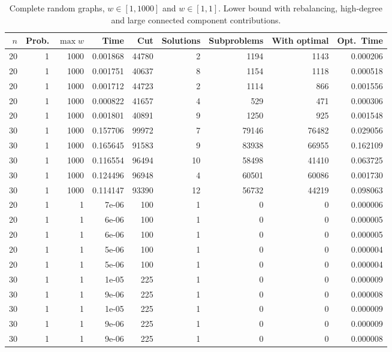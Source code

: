 \documentclass[a4paper,11pt]{article}
\begin{document}
\begin{table}
\begin{center}
\begin{tabular}{|rrr|r|r|rrr|r|}
\hline
$n$ & Prob. & $\max w$ & Time & Cut & Solutions & Subproblems & With
optimal & Opt.\ Time \\
\hline
20 & 1 & 1000 & 0.001868 & 44780 & 2 & 1194 & 1143 & 0.000206 \\
20 & 1 & 1000 & 0.001751 & 40637 & 8 & 1154 & 1118 & 0.000518 \\
20 & 1 & 1000 & 0.001712 & 44723 & 2 & 1114 & 866 & 0.001556 \\
20 & 1 & 1000 & 0.000822 & 41657 & 4 & 529 & 471 & 0.000306 \\
20 & 1 & 1000 & 0.001801 & 40891 & 9 & 1250 & 925 & 0.001548 \\
30 & 1 & 1000 & 0.157706 & 99972 & 7 & 79146 & 76482 & 0.029056 \\
30 & 1 & 1000 & 0.165645 & 91583 & 9 & 83938 & 66955 & 0.162109 \\
30 & 1 & 1000 & 0.116554 & 96494 & 10 & 58498 & 41410 & 0.063725 \\
30 & 1 & 1000 & 0.124496 & 96948 & 4 & 60501 & 60086 & 0.001730 \\
30 & 1 & 1000 & 0.114147 & 93390 & 12 & 56732 & 44219 & 0.098063 \\
\hline
20 & 1 & 1 & 7e-06 & 100 & 1 & 0 & 0 & 0.000006 \\
20 & 1 & 1 & 6e-06 & 100 & 1 & 0 & 0 & 0.000005 \\
20 & 1 & 1 & 6e-06 & 100 & 1 & 0 & 0 & 0.000005 \\
20 & 1 & 1 & 5e-06 & 100 & 1 & 0 & 0 & 0.000004 \\
20 & 1 & 1 & 5e-06 & 100 & 1 & 0 & 0 & 0.000004 \\
30 & 1 & 1 & 1e-05 & 225 & 1 & 0 & 0 & 0.000009 \\
30 & 1 & 1 & 9e-06 & 225 & 1 & 0 & 0 & 0.000008 \\
30 & 1 & 1 & 1e-05 & 225 & 1 & 0 & 0 & 0.000009 \\
30 & 1 & 1 & 9e-06 & 225 & 1 & 0 & 0 & 0.000009 \\
30 & 1 & 1 & 9e-06 & 225 & 1 & 0 & 0 & 0.000008 \\
\hline
\end{tabular}
\end{center}
\caption{Complete random graphs, $w\in[1,1000]$ and $w\in[1,1]$. Lower
  bound with rebalancing, high-degree and large connected component
  contributions.}
\label{tab:complete-all}
\end{table}
\end{document}
